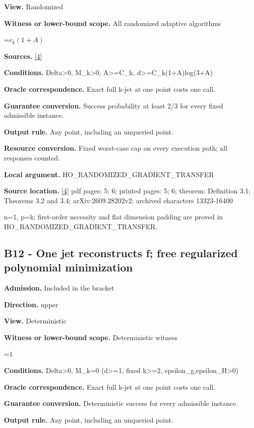\documentclass[10pt,a4paper]{article}
\newcommand{\AtlasMath}[1]{\par\begingroup\centering\setbox0=\hbox{$\displaystyle #1$}\ifdim\wd0>1.4\linewidth\typeout{ATLAS WIDE FORMULA: \the\wd0}\fi\ifdim\wd0>\linewidth\resizebox{\linewidth}{!}{\box0}\else\box0\fi\par\endgroup}
\begin{document}
\textbf{View.} Randomized

\textbf{Witness or lower-bound scope.} All randomized adaptive algorithms

\AtlasMath{c_k(1+A)}
\textbf{Sources.} \href{https://arxiv.org/abs/2609.28202}{[4]}

\textbf{Conditions.} Delta>0, M\_\allowbreak{}k>0, A>=C\_\allowbreak{}k, d>=C\_\allowbreak{}k(1+A)log(3+A)

\textbf{Oracle correspondence.} Exact full k-jet at one point costs one call.

\textbf{Guarantee conversion.} Success probability at least 2/3 for every fixed admissible instance.

\textbf{Output rule.} Any point, including an unqueried point.

\textbf{Resource conversion.} Fixed worst-case cap on every execution path; all responses counted.

\textbf{Local argument.} HO\_\allowbreak{}RANDOMIZED\_\allowbreak{}GRADIENT\_\allowbreak{}TRANSFER

\textbf{Source location.} \href{https://arxiv.org/abs/2609.28202}{[4]} pdf pages: 5; 6; printed pages: 5; 6; theorem: Definition 3.1; Theorems 3.2 and 3.4; arXiv:2609.28202v2; archived characters 13323-16400

n=1, p=k; first-order necessity and flat dimension padding are proved in HO\_\allowbreak{}RANDOMIZED\_\allowbreak{}GRADIENT\_\allowbreak{}TRANSFER.

\subsection{B12 - One jet reconstructs f; free regularized polynomial minimization}
\textbf{Admission.} Included in the bracket

\textbf{Direction.} upper

\textbf{View.} Deterministic

\textbf{Witness or lower-bound scope.} Deterministic witness

\AtlasMath{1}
\textbf{Conditions.} Delta>0, M\_\allowbreak{}k=0 (d>=1, fixed k>=2, epsilon\_\allowbreak{}g,epsilon\_\allowbreak{}H>0)

\textbf{Oracle correspondence.} Exact full k-jet at one point costs one call.

\textbf{Guarantee conversion.} Deterministic success for every admissible instance.

\textbf{Output rule.} Any point, including an unqueried point.
\end{document}
